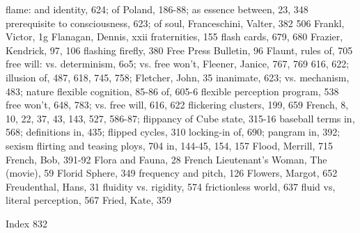 flame: and identity, 624; of Poland, 186-88; as      essence between, 23, 348
  prerequisite to consciousness, 623; of soul,     Franceschini, Valter, 382
  506                                              Frankl, Victor, 1g
Flanagan, Dennis, xxii                             fraternities, 155
flash cards, 679, 680                              Frazier, Kendrick, 97, 106
flashing firefly, 380                              Free Press Bulletin, 96
Flaunt, rules of, 705                              free will: vs. determinism, 6o5; vs. free won't,
Fleener, Janice, 767, 769                            616, 622; illusion of, 487, 618, 745, 758;
Fletcher, John, 35                                   inanimate, 623; vs. mechanism, 483; nature
flexible cognition, 85-86                            of, 605-6
flexible perception program, 538                   free won't, 648, 783; vs. free will, 616, 622
flickering clusters, 199, 659                      French, 8, 10, 22, 37, 43, 143, 527, 586-87;
flippancy of Cube state, 315-16                      baseball terms in, 568; definitions in, 435;
flipped cycles, 310                                  locking-in of, 690; pangram in, 392; sexism
flirting and teasing ploys, 704                      in, 144-45, 154, 157
Flood, Merrill, 715                                French, Bob, 391-92
Flora and Fauna, 28                                French Lieutenant's Woman, The (movie), 59
Florid Sphere, 349                                   frequency and pitch, 126
Flowers, Margot, 652                               Freudenthal, Hans, 31
fluidity vs. rigidity, 574                         frictionless world, 637
fluid vs, literal perception, 567                  Fried, Kate, 359

 Index                                                                                          832

